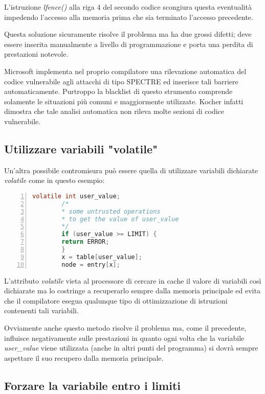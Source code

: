		L'istruzione \emph{lfence()} alla riga 4 del secondo codice scongiura questa eventualità impedendo l'accesso alla memoria prima che sia terminato l'accesso precedente. 
		
		Questa soluzione sicuramente risolve il problema ma ha due grossi difetti; deve essere inserita manualmente a livello di programmazione e porta una perdita di prestazioni notevole\cite{AMD2018speculation}.
		
		Microsoft implementa nel proprio compilatore una rilevazione automatica del codice vulnerabile agli attacchi di tipo SPECTRE ed inserisce tali barriere automaticamente. Purtroppo la blacklist di questo strumento comprende solamente le situazioni più comuni e maggiormente utilizzate. Kocher infatti dimostra che tale analisi automatica non rileva molte sezioni di codice vulnerabile\cite{kocher2018mitigation}.
		
		\subsection{Utilizzare variabili "volatile"}
		
		Un'altra possibile contromisura può essere quella di utilizzare variabili dichiarate \emph{volatile} come in questo esempio:
		
		\begin{lstlisting}[language={C},frame={rlbt},basicstyle=\footnotesize,numbers=left,numberstyle=\scriptsize\color{black}]
		volatile int user_value;
		/*
		* some untrusted operations 
		* to get the value of user_value
		*/
		if (user_value >= LIMIT) {
		return ERROR;
		} 
		x = table[user_value]; 
		node = entry[x];
		\end{lstlisting}
		
		L'attributo \emph{volatile} vieta al processore di cercare in cache il valore di variabili così dichiarate ma lo costringe a recuperarlo sempre dalla memoria principale ed evita che il compilatore esegua qualunque tipo di ottimizzazione di istruzioni contenenti tali variabili.
				
		Ovviamente anche questo metodo risolve il problema ma, come il precedente, influisce negativamente sulle prestazioni in quanto ogni volta che la variabile \emph{user\_value} viene utilizzata (anche in altri punti del programma) si dovrà sempre aspettare il suo recupero dalla memoria principale.
		
		\subsection{Forzare la variabile entro i limiti}
		
